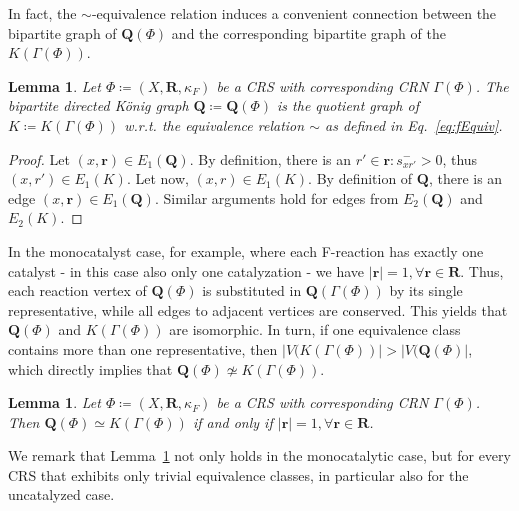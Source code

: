 \documentclass[pdflatex]{sn-jnl}
\theoremstyle{thmstyleone}%
\newtheorem{lemma}[theorem]{Lemma}%
\theoremstyle{examplesty}%
\theoremstyle{thmstylethree}%
\newcommand{\king}{K}
\newcommand{\queen}{\mathbf{Q}}
\newcommand{\FR}[0]{\mathbf{R}}
\newcommand{\fr}[0]{\mathbf{r}}
\newcommand{\cat}{\kappa_F}
\newcommand{\holy}[1]{\begingroup\color{royalpurple}#1\endgroup}
\begin{document}
In fact, the $\sim$-equivalence relation induces a convenient connection
between the bipartite graph of $\queen(\Phi)$ and the corresponding
bipartite graph of the $K(\Gamma(\Phi))$.
\vspace{6pt}
\begin{lemma}\label{lem:QuotGraph}
  Let $\Phi\coloneqq (X,\FR, \cat)$ be a CRS with corresponding CRN
  $\Gamma(\Phi)$. The bipartite directed K\"onig graph 
  $\queen\coloneqq \queen(\Phi)$ is the quotient graph of $\king \coloneqq
  \king(\Gamma(\Phi))$ w.r.t. the equivalence relation $\sim$ as defined in
  Eq.~\ref{eq:fEquiv}.
\end{lemma}
\begin{proof}
  Let $(x,\fr) \in E_1(\queen)$. By definition, there is an $r'\in \fr:
  s^-_{xr'}>0$, thus $(x,r')\in E_1(\king)$.  Let now, $(x,r)\in
  E_1(\king)$. By definition of $\queen$, there is an edge $(x,\fr)\in
  E_1(\queen)$.  Similar arguments hold for edges from $E_2(\queen)$ and
  $E_2(\king)$.
\end{proof}
\vspace{6pt}

\holy{In the monocatalyst case, for example, where each F-reaction has exactly
one catalyst - in this case also only one catalyzation - we have 
$\vert \fr \vert = 1, \forall \fr \in \FR$.} Thus, each reaction vertex of $\queen(\Phi)$ 
is substituted in $\queen(\Gamma(\Phi))$ by its single representative, while all 
edges to adjacent vertices are conserved. This yields that $\queen(\Phi)$ 
and $\king(\Gamma(\Phi))$ are isomorphic. In turn, if one equivalence class 
contains more than one representative, then $|V(\king(\Gamma(\Phi))|>|V(\queen(\Phi)|$, 
which directly implies that $\queen(\Phi)\not \simeq \king(\Gamma(\Phi))$.

\vspace{6pt}
\begin{lemma}\label{lem:IsoQK}
  Let $\Phi\coloneqq (X, \FR, \cat)$ be a CRS with corresponding CRN
  $\Gamma(\Phi)$. Then $\queen(\Phi)\simeq \king(\Gamma(\Phi))$ if and only
  if $\vert \fr \vert = 1, \forall \fr \in \FR$.
\end{lemma}
\vspace{6pt}

We remark that Lemma~\ref{lem:IsoQK} not only holds in the monocatalytic
case, but for every CRS that exhibits only trivial equivalence classes, in
particular also for the uncatalyzed case.
\end{document}
